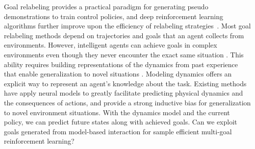 \documentclass{article}
\newcommand{\lxhan}[1]{{ \color{red}[LH: #1]}}
\newcommand{\rui}[1]{{ \color{cyan}[Rui: #1]}}
\begin{document}
Goal relabeling provides a practical paradigm for generating pseudo demonstrations to train control policies, and deep reinforcement learning algorithms further improve upon the efficiency of relabeling strategies~\cite{DBLP:conf/ijcai/Kaelbling93, andrychowicz2017hindsight}.
Most goal relabeling methods depend on trajectories and goals that an agent collects from environments. 
However, intelligent agents can achieve goals in complex environments even though they never encounter the exact same situation \cite{schaul2015universal}. This ability requires building representations of the dynamics from past experience that enable generalization to novel situations \cite{schaul2013better,singh2003learning}. Modeling dynamics offers an explicit way to represent an agent’s knowledge about the task. Existing methods \cite{nagabandi2018neural,DBLP:conf/nips/JannerFZL19,hafner2019dream,schrittwieser2020mastering} have apply neural models to greatly facilitate predicting physical dynamics and the consequences of actions, and provide a strong inductive bias for generalization to novel environment situations. With the dynamics model and the current policy, we can predict future states along with achieved goals. Can we exploit goals generated from model-based interaction for sample efficient multi-goal reinforcement learning?

\end{document}
